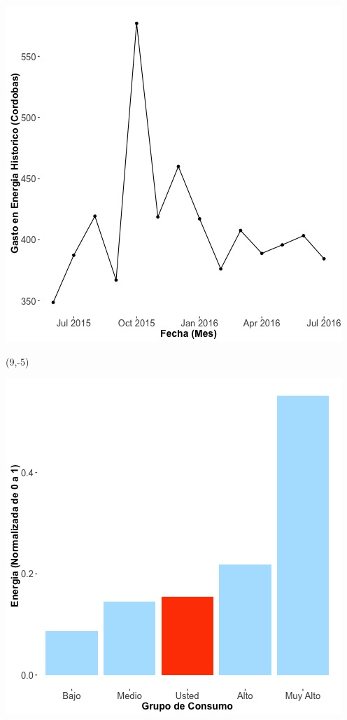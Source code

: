 \documentclass{article}\usepackage[]{graphicx}\usepackage[]{color}
\newenvironment{knitrout}{}{} %
\begin{document}
\begin{knitrout}
\color{fgcolor}
\includegraphics[scale=0.65]{figure/A14_historico_cordobas} 
\end{knitrout}

 \begin{textblock}{1}(9,-5)
\begin{minipage}{20em}
\begingroup

\endgroup
\end{minipage}
\end{textblock}


\begin{knitrout}
\color{fgcolor}
\includegraphics[scale=0.65]{figure/A14_neighbor_plot} 
\end{knitrout}
\end{document}
